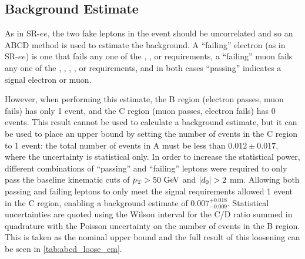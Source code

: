 \subsection{Background Estimate}
As in SR-$ee$, the two fake leptons in the event should be uncorrelated and so an ABCD method is used to estimate the background. A ``failing'' electron (as in SR-$ee$) is one that fails any one of the \dpt, \chiID, or \nmiss requirements, a ``failing'' muon fails any one of the  \chiID, \chiCB, \nmiss, \nprecision, or \nphi requirements, and in both cases ``passing'' indicates a signal electron or muon.

However, when performing this estimate, the B region (electron passes, muon fails) has only 1 event, and the C region (muon passes, electron fails) has 0 events. This result cannot be used to calculate a background estimate, but it can be used to place an upper bound by setting the number of events in the C region to 1 event: the total number of events in A must be less than $0.012 \pm 0.017$, where the uncertainty is statistical only. In order to increase the statistical power, different combinations of ``passing'' and ``failing'' leptons were required to only pass the baseline kinematic cuts of $\pt > 50 \GeV$ and $|d_0| > 2$ mm. Allowing both passing and failing leptons to only meet the signal requirements allowed 1 event in the C region, enabling a background estimate of $0.007^{+0.018}_{-0.009}$. Statistical uncertainties are quoted using the Wilson interval for the C/D ratio summed in quadrature with the Poisson uncertainty on the number of events in the B region. This is taken as the nominal upper bound and the full result of this loosening can be seen in \autoref{tab:abcd_loose_em}.

